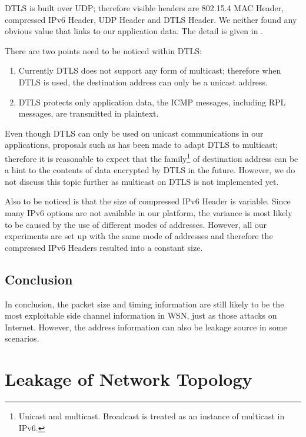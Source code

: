 DTLS is built over UDP; therefore visible headers are 802.15.4 MAC Header, compressed IPv6 Header, UDP Header and DTLS Header. We neither found any obvious value that links to our application data. The detail is given in . 

There are two points need to be noticed within DTLS:
\begin{enumerate}
	\item Currently DTLS does not support any form of multicast; therefore when DTLS is used, the destination address can only be a unicast address. 

	\item DTLS protects only application data, the ICMP messages, including RPL messages, are transmitted in plaintext.
\end{enumerate}

Even though DTLS can only be used on unicast communications in our applications, proposals such as \cite{DtlsMulticast1} \cite{DtlsMulticast2} has been made to adapt DTLS to multicast; therefore it is reasonable to expect that the family\footnote{Unicast and multicast. Broadcast is treated as an instance of multicast in IPv6.} of destination address can be a hint to the contents of data encrypted by DTLS in the future. However, we do not discuss this topic further as multicast on DTLS is not implemented yet.

Also to be noticed is that the size of compressed IPv6 Header is variable. Since many IPv6 options are not available in our platform, the variance is most likely to be caused by the use of different modes of addresses. However, all our experiments are set up with the same mode of addresses and therefore the compressed IPv6 Headers resulted into a constant size.

\subsection{Conclusion}

In conclusion, the packet size and timing information are still likely to be the most exploitable side channel information in WSN, just as those attacks on Internet. However, the address information can also be leakage source in some scenarios.

\section{Leakage of Network Topology} \label{Sec: Leakage of Network Topology}

